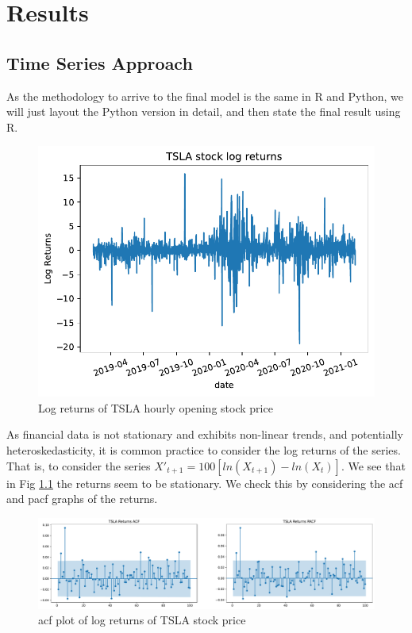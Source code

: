 \chapter{Results}

\section{Time Series Approach}
As the methodology to arrive to the final model is the same in R and Python, we will just layout the Python version in detail, and then state the final result using R.

\begin{figure}
	\centering
	\includegraphics[width=\textwidth]{img/img_returns.pdf}
	\caption{Log returns of TSLA hourly opening stock price}
	\label{fig:tsla_returns}
\end{figure}

As financial data is not stationary and exhibits non-linear trends, and potentially heteroskedasticity, it is common practice to consider the log returns of the series. That is, to consider the series $X'_{t+1} = 100[ln(X_{t+1})-ln(X_t)]$. We see that in Fig \ref{fig:tsla_returns} the returns seem to be stationary. We check this by considering the \acrshort{acf} and \acrshort{pacf} graphs of the returns.

\begin{figure}
	\centering
	\includegraphics[width=\textwidth]{img/img_acf_tsla.pdf}
	\caption{\acrshort{acf} plot of log returns of TSLA stock price}
	\label{fig:acf_returns}
\end{figure}

